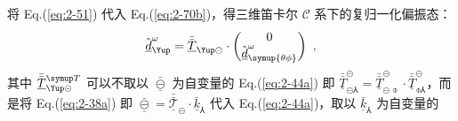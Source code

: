 将 Eq.(\ref{eq:2-51}) 代入 Eq.(\ref{eq:2-70b})，得三维笛卡尔 $\mathcal{C}$ 系下的复归一化偏振态：
\begin{equation} \label{eq:2-71}
	\hat{\underline{d}}^{\omega}_{\Yup} = \bar{\bar{\underline{T}}}_{\Yup\circleddash} \cdot \begin{pmatrix} 0 \\ \hat{\underline{d}}^{\omega}_{\symup{\theta\phi}} \end{pmatrix} ~,
\end{equation}
其中 $\bar{\bar{\underline{T}}}_{\Yup\circleddash}^{\symup T}$ 可以不取以 $\bar{\underline{\circleddash}}$ 为自变量的 Eq.(\ref{eq:2-44a}) 即 $\bar{\bar{\underline{T}}}^{\circleddash}_{\circleddash\Yup} = \bar{\bar{\underline{T}}}^{\circleddash}_{\circleddash\obar} \cdot \bar{\bar{\underline{T}}}^{\circleddash}_{\obar\Yup}$，而是将 Eq.(\ref{eq:2-38a}) 即 $\bar{\underline{\circleddash}} = \bar{\bar{\underline{\mathcal{T}}}}_{\circleddash} \cdot \bar{\underline{k}}_{\Yup}$ 代入 Eq.(\ref{eq:2-44a})，取以 ${\bar{\underline{k}}}_{\Yup}$ 为自变量的
